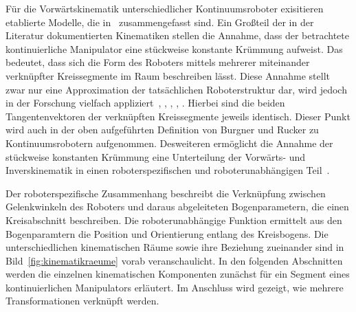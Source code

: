 Für die Vorwärtskinematik unterschiedlicher Kontinuumsroboter exisitieren etablierte Modelle, die in~\cite{WIJ10} zusammengefasst sind.
Ein Großteil der in der Literatur dokumentierten Kinematiken stellen die Annahme, dass der betrachtete kontinuierliche Manipulator eine stückweise konstante Krümmung aufweist. 
Das bedeutet, dass sich die Form des Roboters mittels mehrerer miteinander verknüpfter Kreissegmente im Raum beschreiben lässt. Diese Annahme stellt zwar nur eine Approximation der tatsächlichen Roboterstruktur dar, wird jedoch in der Forschung vielfach appliziert~\cite{HW03}, \cite{STF04}, \cite{JW06a}, \cite{RJWRC09}, \cite{DLIB10}. Hierbei sind die beiden Tangentenvektoren der verknüpften Kreissegmente jeweils identisch. Dieser Punkt wird auch in der oben aufgeführten Definition von Burgner und Rucker zu Kontinuumsrobotern aufgenommen.
Desweiteren ermöglicht die Annahme der stückweise konstanten Krümmung eine Unterteilung der Vorwärts- und Inverskinematik in einen roboterspezifischen und roboterunabhängigen Teil~\cite{WIJ10}. 

Der roboterspezifische Zusammenhang beschreibt die Verknüpfung zwischen Gelenkwinkeln des Roboters und daraus abgeleiteten Bogenparametern, die einen Kreisabschnitt beschreiben. Die roboterunabhängige Funktion ermittelt aus den Bogenparamtern die Position und Orientierung entlang des Kreisbogens.
Die unterschiedlichen kinematischen Räume sowie ihre Beziehung zueinander sind in Bild~\ref{fig:kinematikraeume} vorab veranschaulicht. In den folgenden Abschnitten werden die einzelnen kinematischen Komponenten zunächst für ein Segment eines kontinuierlichen Manipulators erläutert. Im Anschluss wird gezeigt, wie mehrere Transformationen verknüpft werden.  

